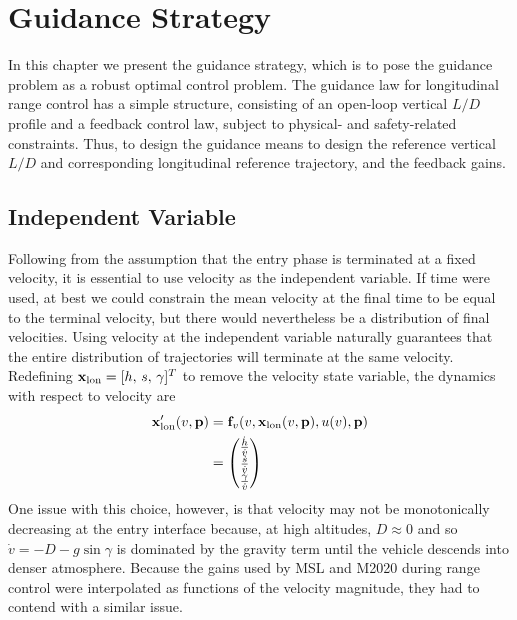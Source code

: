 \chapter{Guidance Strategy}
In this chapter we present the guidance strategy, which is to pose the guidance problem as a robust optimal control problem. 
The guidance law for longitudinal range control has a simple structure, consisting of an open-loop vertical $L/D$ profile and a feedback control law, subject to physical- and safety-related constraints. Thus, to design the guidance means to design the reference vertical $L/D$ and corresponding longitudinal reference trajectory, and the feedback gains. 
%

\section{Independent Variable}
Following from the assumption that the entry phase is terminated at a fixed velocity, it is essential to use velocity as the independent variable. If time were used, at best we could constrain the mean velocity at the final time to be equal to the terminal velocity, but there would nevertheless be a distribution of final velocities. Using velocity at the independent variable naturally guarantees that the entire distribution of trajectories will terminate at the same velocity.
Redefining $\mathbf{x}_{\mathrm{lon}} = [h,\,s,\,\gamma]^T$ to remove the velocity state variable, the dynamics with respect to velocity are 
\begin{align}
	\mathbf{x}_{\mathrm{lon}}'(v,\mathbf{p}) &= \mathbf{f}_v(v,\mathbf{x}_{\mathrm{lon}}(v,\mathbf{p}),u(v),\mathbf{p}) \label{Eq:DynamicsWRTVel}\\
	&= \begin{pmatrix}
		\frac{\dot{h}}{\dot{v}} \\
		\frac{\dot{s}}{\dot{v}} \\
		\frac{\dot{\gamma}}{\dot{v}} 
	\end{pmatrix}
\end{align}
One issue with this choice, however, is that velocity may not be monotonically decreasing at the entry interface because, at high altitudes, $D\approx0$ and so $\dot{v}=-D-g\sin\gamma$ is dominated by the gravity term until the vehicle descends into denser atmosphere. Because the gains used by MSL and M2020 during range control were interpolated as functions of the velocity magnitude, they had to contend with a similar issue.

